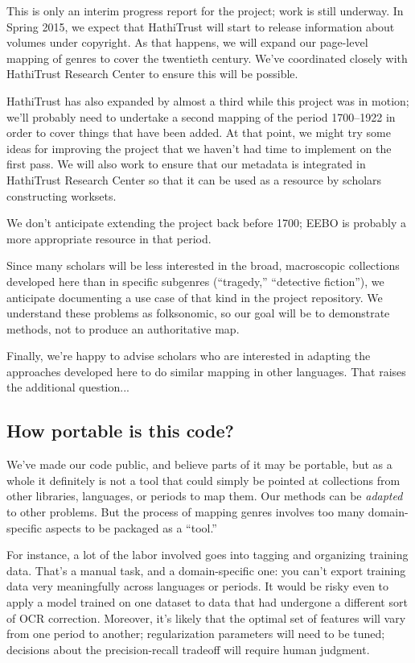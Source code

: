 \documentclass[paper=a4, fontsize=12pt]{scrartcl}
\numberwithin{equation}{section}		%
\numberwithin{figure}{section}			%
\numberwithin{table}{section}				%
\begin{document}
This is only an interim progress report for the project; work is still underway. In Spring 2015, we expect that HathiTrust will start to release information about volumes under copyright. As that happens, we will expand our page-level mapping of genres to cover the twentieth century. We've coordinated closely with HathiTrust Research Center to ensure this will be possible.

HathiTrust has also expanded by almost a third while this project was in motion; we'll probably need to undertake a second mapping of the period 1700--1922 in order to cover things that have been added. At that point, we might try some ideas for improving the project that we haven't had time to implement on the first pass. We will also work to ensure that our metadata is integrated in HathiTrust Research Center so that it can be used as a resource by scholars constructing worksets.

We don't anticipate extending the project back before 1700; EEBO is probably a more appropriate resource in that period.

Since many scholars will be less interested in the broad, macroscopic collections developed here than in specific subgenres (``tragedy,'' ``detective fiction''), we anticipate documenting a use case of that kind in the project repository. We understand these problems as folksonomic, so our goal will be to demonstrate methods, not to produce an authoritative map.

Finally, we're happy to advise scholars who are interested in adapting the approaches developed here to do similar mapping in other languages. That raises the additional question...

\subsection{How portable is this code?}

We've made our code public, and believe parts of it may be portable, but as a whole it definitely is not a tool that could simply be pointed at collections from other libraries, languages, or periods to map them. Our methods can be \textit{adapted} to other problems. But the process of mapping genres involves too many domain-specific aspects to be packaged as a ``tool.''

For instance, a lot of the labor involved goes into tagging and organizing training data. That's a manual task, and a domain-specific one: you can't export training data very meaningfully across languages or periods. It would be risky even to apply a model trained on one dataset to data that had undergone a different sort of OCR correction. Moreover, it's likely that the optimal set of features will vary from one period to another; regularization parameters will need to be tuned; decisions about the precision-recall tradeoff will require human judgment.
\end{document}
